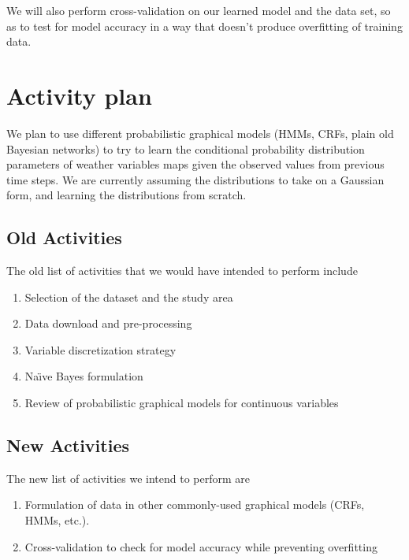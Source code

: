 \documentclass{article}
\begin{document}
We will also perform cross-validation on our learned model and the data set, so as to test for model accuracy in a way that doesn't produce overfitting of training data.

\section{Activity plan}

We plan to use different probabilistic graphical models (HMMs, CRFs, plain old Bayesian networks) to try to learn the
conditional probability distribution parameters of weather variables maps given the observed values
from previous time steps. We are currently assuming the distributions to take on a Gaussian form, and learning the distributions from scratch.

\subsection{Old Activities}
The old list of activities that we would have intended to perform include
\begin{enumerate}
\item Selection of the dataset and the study area
\item Data download and pre-processing
\item Variable discretization strategy
\item Na\"\i ve Bayes formulation
\item Review of probabilistic graphical models for continuous variables
\end{enumerate}

\subsection{New Activities}
The new list of activities we intend to perform are
\begin{enumerate}
\item Formulation of data in other commonly-used graphical models (CRFs, HMMs, etc.).
\item Cross-validation to check for model accuracy while preventing overfitting
\end{enumerate}

\nocite{nasseri2008}


%
\end{document}
